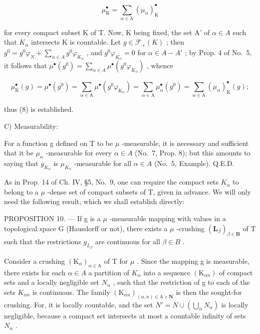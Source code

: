 \[
\mu_ {\mathrm{K}} ^ {\bullet} = \sum_ {\alpha \in \mathrm{A}} (\mu_ {\alpha}) _ {\mathrm{K}} ^ {\bullet}\tag{8}
\]

for every compact subset K of T. Now, K being fixed, the set A' of \(\alpha \in A\) such that \(K_{\alpha}\) intersects K is countable. Let \(g \in \mathcal{F}_{+}(K)\) ; then \(g^{0} = g^{0}\varphi_{N} + \sum_{\alpha \in A} g^{0}\varphi_{K_{\alpha}}\) , and \(g^{0}\varphi_{K_{\alpha}} = 0\) for \(\alpha \in A - A'\) ; by Prop. 4 of No.~5, it follows that \(\mu^{\bullet}(g^{0}) = \sum_{\alpha \in A} \mu^{\bullet}(g^{0}\varphi_{K_{\alpha}})\) , whence

\[
\mu_ {\mathrm{K}} ^ {\bullet} (g) = \mu^ {\bullet} (g ^ {0}) = \sum_ {\alpha \in \mathrm{A}} \mu^ {\bullet} (g ^ {0} \varphi_ {\mathrm{K} _ {\alpha}}) = \sum_ {\alpha \in \mathrm{A}} \mu_ {\alpha} ^ {\bullet} (g ^ {0}) = \sum_ {\alpha \in \mathrm{A}} (\mu_ {\alpha}) _ {\mathrm{K}} ^ {\bullet} (g);
\]

thus (8) is established.

C) Measurability:

For a function g defined on T to be \(\mu\) -measurable, it is necessary and sufficient that it be \(\mu_{\alpha}\) -measurable for every \(\alpha \in A\) (No.~7, Prop. 8); but this amounts to saying that \(g_{K_{\alpha}}\) is \(\mu_{K_{\alpha}}\) -measurable for all \(\alpha \in A\) (No.~5, Example). Q.E.D.

As in Prop. 14 of Ch. IV, §5, No.~9, one can require the compact sets \(K_{\alpha}\) to belong to a \(\mu\) -dense set of compact subsets of T, given in advance. We will only need the following result, which we shall establish directly:

PROPOSITION 10. --- If g is a \(\mu\) -measurable mapping with values in a topological space G (Hausdorff or not), there exists a \(\mu\) -crushing \((\mathbf{L}_{\beta})_{\beta\in\mathbf{B}}\) of T such that the restrictions \(g_{L_{\beta}}\) are continuous for all \(\beta\in B\) .

Consider a crushing \((\mathrm{K}_{\alpha})_{\alpha\in\mathrm{A}}\) of T for \(\mu\) . Since the mapping g is measurable, there exists for each \(\alpha\in A\) a partition of \(K_{\alpha}\) into a sequence \((\mathrm{K}_{\alpha n})\) of compact sets and a locally negligible set \(N_{\alpha}\) , such that the restriction of g to each of the sets \(K_{\alpha n}\) is continuous. The family \((\mathrm{K}_{\alpha n})_{(\alpha,n)\in\mathrm{A}\times\mathbf{N}}\) is then the sought-for crushing. For, it is locally countable, and the set \(N' = N \cup \left( \bigcup_{\alpha} N_{\alpha} \right)\) is locally negligible, because a compact set intersects at most a countable infinity of sets \(N_{\alpha}\) .

